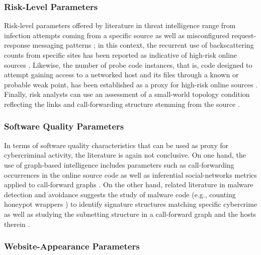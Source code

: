 \subsubsection{Risk-Level Parameters}

Risk-level parameters offered by literature in threat intelligence range from infection attempts coming from a specific source \cite{Yannikos2018} as well as misconfigured request-response messaging patterns \cite{7317717}; in this context, the recurrent use of backscattering counts from specific sites has been reported as indicative of high-risk online sources \cite{Fachkha16}. Likewise, the number of probe code instances, that is, code designed to attempt gaining access to a networked host and its files through a known or probable weak point, has been established as a proxy for high-risk online sources \cite{CanepaC13}. Finally, risk analysts can use an assessment of a small-world topology condition reflecting the links and call-forwarding structure stemming from the source \cite{Narayanan2009,Kleinberg2000}.

\subsubsection{Software Quality Parameters}

In terms of software quality characteristics that can be used as proxy for cybercriminal activity, the literature is again not conclusive. 
On one hand, the use of graph-based intelligence includes parameters such as call-forwarding occurrences \cite{Huang2018} in the online source code as well as inferential social-networks metrics applied to call-forward graphs \cite{Monk18}. On the other hand, related literature in malware detection and avoidance suggests the study of malware code (e.g., counting honeypot wrappers \cite{Schneider2011Mitigation,Bou-HarbDA15}) to identify signature structures matching specific cybercrime \cite{ShoshaLGM12} as well as studying the subnetting structure in a call-forward graph and the hosts therein \cite{abs-1811-10050,AhrendJJ16}.

\subsubsection{Website-Appearance Parameters}

